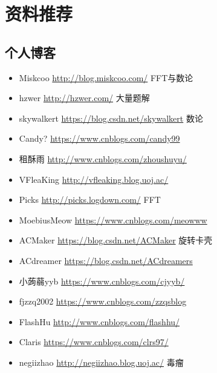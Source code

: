 \chapter{资料推荐}
\section{个人博客}
\begin{itemize}
	\item Miskcoo \url{http://blog.miskcoo.com/} FFT与数论
	\item hzwer \url{http://hzwer.com/} 大量题解
    \item skywalkert \url{https://blog.csdn.net/skywalkert} 数论
    \item Candy? \url{https://www.cnblogs.com/candy99}
    \item 租酥雨 \url{http://www.cnblogs.com/zhoushuyu/}
    \item VFleaKing \url{http://vfleaking.blog.uoj.ac/}
    \item Picks \url{http://picks.logdown.com/} FFT
    \item MoebiusMeow \url{https://www.cnblogs.com/meowww}
    \item ACMaker \url{https://blog.csdn.net/ACMaker} 旋转卡壳
    \item ACdreamer \url{https://blog.csdn.net/ACdreamers}
    \item 小蒟蒻yyb \url{https://www.cnblogs.com/cjyyb/}
    \item fjzzq2002 \url{https://www.cnblogs.com/zzqsblog}
    \item FlashHu \url{http://www.cnblogs.com/flashhu/}
    \item Claris \url{https://www.cnblogs.com/clrs97/}
    \item negiizhao \url{http://negiizhao.blog.uoj.ac/} 毒瘤
\end{itemize}
